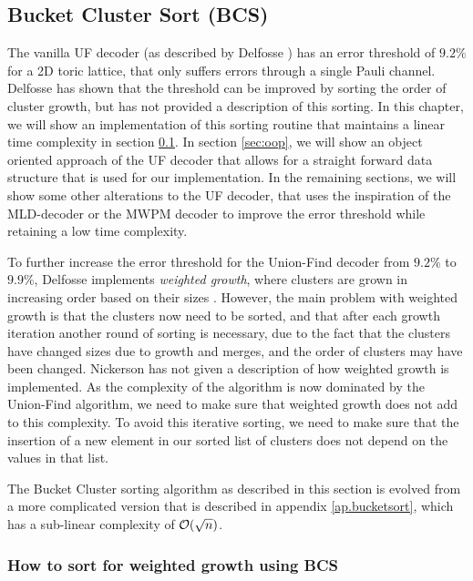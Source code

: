 \subsection{Bucket Cluster Sort (BCS)}\label{sec:bucketclustersort}
The vanilla UF decoder (as described by Delfosse \cite{delfosse2017almost}) has an error threshold of $9.2\%$ for a 2D toric lattice, that only suffers errors through a single Pauli channel. Delfosse has shown that the threshold can be improved by sorting the order of cluster growth, but has not provided a description of this sorting. In this chapter, we will show an implementation of this sorting routine that maintains a linear time complexity in section \ref{sec:bucketclustersort}. In section \ref{sec:oop}, we will show an object oriented approach of the UF decoder that allows for a straight forward data structure that is used for our implementation. In the remaining sections, we will show some other alterations to the UF decoder, that uses the inspiration of the MLD-decoder or the MWPM decoder to improve the error threshold while retaining a low time complexity.


To further increase the error threshold for the Union-Find decoder from $9.2\%$ to $9.9\%$, Delfosse implements \emph{weighted growth}, where clusters are grown in increasing order based on their sizes \cite{delfosse2017almost}. However, the main problem with weighted growth is that the clusters now need to be sorted, and that after each growth iteration another round of sorting is necessary, due to the fact that the clusters have changed sizes due to growth and merges, and the order of clusters may have been changed. Nickerson has not given a description of how weighted growth is implemented. As the complexity of the algorithm is now dominated by the Union-Find algorithm, we need to make sure that weighted growth does not add to this complexity. To avoid this iterative sorting, we need to make sure that the insertion of a new element in our sorted list of clusters does not depend on the values in that list.

The Bucket Cluster sorting algorithm as described in this section is evolved from a more complicated version that is described in appendix \ref{ap.bucketsort}, which has a sub-linear complexity of $\mathcal{O}(\sqrt{n})$.

\subsubsection{How to sort for weighted growth using BCS}

